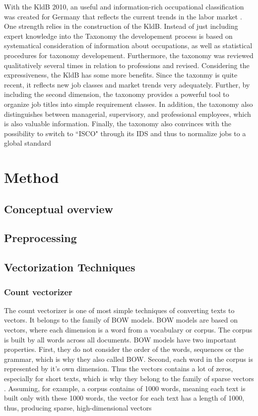 \documentclass[12pt, a4paper, titlepage]{article}
\begin{document}
With the KldB 2010, an useful and information-rich occupational classification was created for Germany that reflects the current trends in the labor market \citep{Paulus2013}. One strength relies in the construction of the \ac{KldB}. Instead of just including expert knowledge into the Taxonomy the developement process is based on systematical consideration of information about occupations, as well as statistical procedures for taxonomy developement. Furthermore, the taxonomy was reviewed qualitatively several times in relation to professions and revised. Considering the expressiveness, the \ac{KldB} has some more benefits. Since the taxonmy is quite recent, it reflects new job classes and market trends very adequately. Further, by including the second dimension, the taxonomy provides a powerful tool to organize job titles into simple requirement classes.  In addition, the taxonomy also distinguishes between managerial, supervisory, and professional employees, which is also valuable information. Finally, the taxonomy also convinces with the possibility to switch to ``\ac{ISCO}" through its IDS and thus to normalize jobs to a global standard \citep{Bundesagentur2011b}

\section{Method}
\subsection{Conceptual overview}
\subsection{Preprocessing}
\subsection{Vectorization Techniques}
\subsubsection{Count vectorizer}
The count vectorizer is one of most simple techniques of converting texts to vectors. It belongs to the family of \ac{BOW} models. \ac{BOW} models are based on vectors, where each dimension is a word from a vocabulary or corpus. The corpus is built by all words across all documents. \ac{BOW} models have two important properties. First, they do not consider the order of the words, sequences or the grammar, which is why they also called \ac{BOW}. Second, each word in the corpus is represented by it's own dimension. Thus the vectors contains a lot of zeros, especially for short texts, which is why they belong to the family of sparse vectors \citep{ajose2020}.  Assuming, for example, a corpus contains of 1000 words, meaning each text is built only with these 1000 words, the vector for each text has a length of 1000, thus, producing sparse, high-dimensional vectors \citep{kulkarni2021, sarkar2016}
\end{document}
